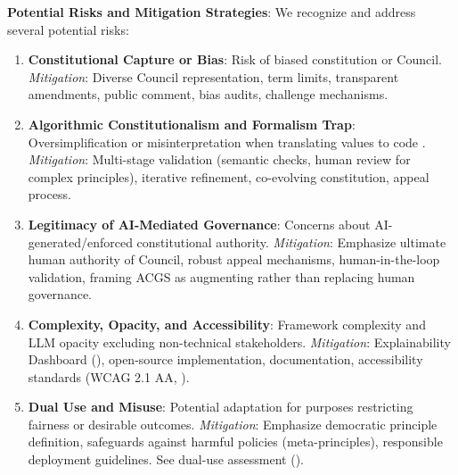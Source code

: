 \documentclass[manuscript,screen,9pt]{acmart}
\begin{document}
\textbf{Potential Risks and Mitigation Strategies}:
We recognize and address several potential risks:
\begin{enumerate}[leftmargin=*,itemsep=1pt,parsep=1pt]
	\item \textbf{Constitutional Capture or Bias}: Risk of biased constitution or Council.
	      \textit{Mitigation}: Diverse Council representation, term limits, transparent amendments, public comment, bias audits, challenge mechanisms.
	\item \textbf{Algorithmic Constitutionalism and Formalism Trap}: Oversimplification or misinterpretation when translating values to code \cite{Selbst2019FairnessAccountability}.
	      \textit{Mitigation}: Multi-stage validation (semantic checks, human review for complex principles), iterative refinement, co-evolving constitution, appeal process.
	\item \textbf{Legitimacy of AI-Mediated Governance}: Concerns about AI-generated/enforced constitutional authority.
	      \textit{Mitigation}: \sloppy Emphasize ultimate human authority of Council, robust appeal mechanisms, human-in-the-loop validation, framing ACGS as augmenting rather than replacing human governance. \fussy
	\item \textbf{Complexity, Opacity, and Accessibility}: Framework complexity and LLM opacity excluding non-technical stakeholders.
	      \textit{Mitigation}: Explainability Dashboard (), open-source implementation, documentation, accessibility standards (WCAG 2.1 AA, ).
	\item \textbf{Dual Use and Misuse}: Potential adaptation for purposes restricting fairness or desirable outcomes.
	      \textit{Mitigation}: \sloppy Emphasize democratic principle definition, safeguards against harmful policies (meta-principles), responsible deployment guidelines. See dual-use assessment (). \fussy
\end{enumerate}
\end{document}
